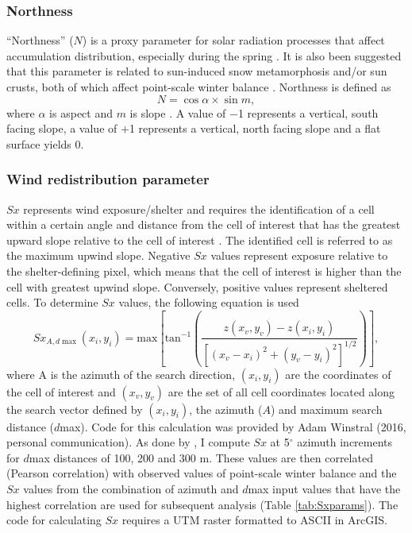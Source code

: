 \documentclass{sfuthesis}
\begin{document}
\subsubsection*{Northness} 

``Northness'' ($N$) is a proxy parameter for solar radiation processes that affect accumulation distribution, especially during the spring \citep{Revuelto2014}. It is also been suggested that this parameter is related to sun-induced snow metamorphosis and/or sun crusts, both of which affect point-scale winter balance \citep{McGrath2015}. Northness is defined as 
\begin{equation}
N = \cos{\alpha} \times \sin{m},
\end{equation}
where $\alpha$ is aspect and $m$ is slope \citep{Molotch2005}. A value of $-$1 represents a vertical, south facing slope, a value of $+$1 represents a vertical, north facing slope and a flat surface yields 0. 


\subsubsection*{Wind redistribution parameter} 

$Sx$ represents wind exposure/shelter and requires the identification of a cell within a certain angle and distance from the cell of interest that has the greatest upward slope relative to the cell of interest \citep{Winstral2002}. The identified cell is referred to as the maximum upwind slope. Negative $Sx$ values represent exposure relative to the shelter-defining pixel, which means that the cell of interest is higher than the cell with greatest upwind slope. Conversely, positive values represent sheltered cells. To determine $Sx$ values, the following equation is used
\begin{equation}
Sx_{A, d\max}(x_i, y_i) = \textrm{max} \left[ \textrm{tan}^{-1} \left( \frac{z(x_v,y_v)-z(x_i,y_i)}{[(x_v-x_i)^2+(y_v-y_i)^2]^{1/2}} \right) \right] ,
\end{equation}
where A is the azimuth of the search direction, $(x_i, y_i)$ are the coordinates of the cell of interest and $(x_v, y_v)$ are the set of all cell coordinates located along the search vector defined by	$(x_i, y_i)$, the azimuth ($A$) and maximum search distance ($d$max). Code for this calculation was provided by Adam Winstral (2016, personal communication). As done by \cite{McGrath2015}, I compute $Sx$ at 5$^{\circ}$ azimuth increments for $d$max distances of 100, 200 and 300 m. These values are then correlated (Pearson correlation) with observed values of point-scale winter balance and the $Sx$ values from the combination of azimuth and $d$max input values that have the highest correlation are used for subsequent analysis (Table \ref{tab:Sxparams}). The code for calculating $Sx$ requires a UTM raster formatted to ASCII in ArcGIS. 
\end{document}
